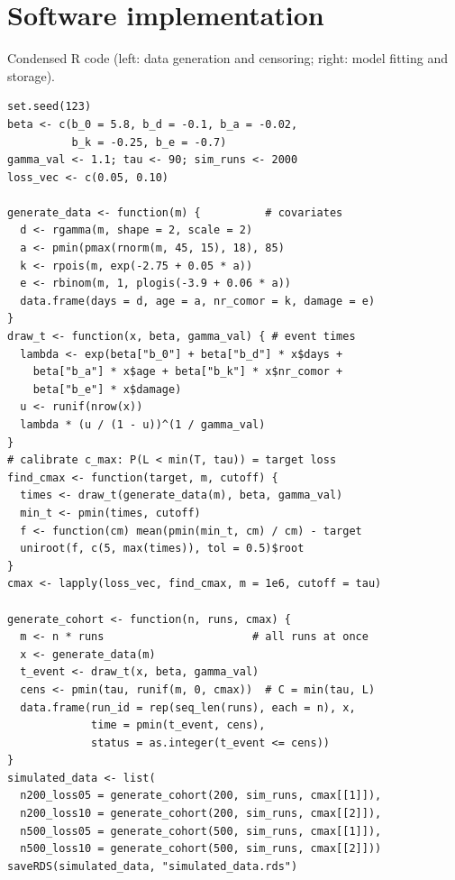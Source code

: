 \documentclass[10pt,a4paper]{article}
\begin{document}
\section*{Software implementation}
Condensed R code (left: data generation and censoring; right: model fitting and storage).\\[2pt]
\begin{minipage}[t]{0.49\textwidth}
\begin{lstlisting}[style=rcode]
set.seed(123)
beta <- c(b_0 = 5.8, b_d = -0.1, b_a = -0.02,
          b_k = -0.25, b_e = -0.7)
gamma_val <- 1.1; tau <- 90; sim_runs <- 2000
loss_vec <- c(0.05, 0.10)

generate_data <- function(m) {          # covariates
  d <- rgamma(m, shape = 2, scale = 2)
  a <- pmin(pmax(rnorm(m, 45, 15), 18), 85)
  k <- rpois(m, exp(-2.75 + 0.05 * a))
  e <- rbinom(m, 1, plogis(-3.9 + 0.06 * a))
  data.frame(days = d, age = a, nr_comor = k, damage = e)
}
draw_t <- function(x, beta, gamma_val) { # event times
  lambda <- exp(beta["b_0"] + beta["b_d"] * x$days +
    beta["b_a"] * x$age + beta["b_k"] * x$nr_comor +
    beta["b_e"] * x$damage)
  u <- runif(nrow(x))
  lambda * (u / (1 - u))^(1 / gamma_val)
}
# calibrate c_max: P(L < min(T, tau)) = target loss
find_cmax <- function(target, m, cutoff) {
  times <- draw_t(generate_data(m), beta, gamma_val)
  min_t <- pmin(times, cutoff)
  f <- function(cm) mean(pmin(min_t, cm) / cm) - target
  uniroot(f, c(5, max(times)), tol = 0.5)$root
}
cmax <- lapply(loss_vec, find_cmax, m = 1e6, cutoff = tau)

generate_cohort <- function(n, runs, cmax) {
  m <- n * runs                       # all runs at once
  x <- generate_data(m)
  t_event <- draw_t(x, beta, gamma_val)
  cens <- pmin(tau, runif(m, 0, cmax))  # C = min(tau, L)
  data.frame(run_id = rep(seq_len(runs), each = n), x,
             time = pmin(t_event, cens),
             status = as.integer(t_event <= cens))
}
simulated_data <- list(
  n200_loss05 = generate_cohort(200, sim_runs, cmax[[1]]),
  n200_loss10 = generate_cohort(200, sim_runs, cmax[[2]]),
  n500_loss05 = generate_cohort(500, sim_runs, cmax[[1]]),
  n500_loss10 = generate_cohort(500, sim_runs, cmax[[2]]))
saveRDS(simulated_data, "simulated_data.rds")
\end{lstlisting}
\end{minipage}\hfill
\end{document}
